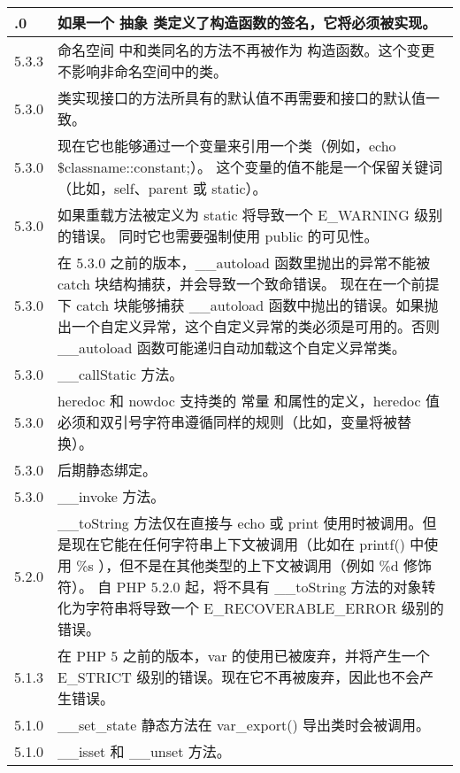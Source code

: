 \begin{longtable}{|m{30pt}|m{350pt}|}
\endlastfoot
\hline
5.4.0	 &如果一个 抽象 类定义了构造函数的签名，它将必须被实现。\\
\hline
5.3.3	 & 命名空间 中和类同名的方法不再被作为 构造函数。这个变更不影响非命名空间中的类。\\
\hline
5.3.0	 &类实现接口的方法所具有的默认值不再需要和接口的默认值一致。\\
\hline
5.3.0	 &现在它也能够通过一个变量来引用一个类（例如，echo \$classname::constant;）。 这个变量的值不能是一个保留关键词（比如，self、parent 或 static）。\\
\hline
5.3.0	 &如果重载方法被定义为 static 将导致一个 E\_WARNING 级别的错误。 同时它也需要强制使用 public 的可见性。\\
\hline
5.3.0	 &在 5.3.0 之前的版本，\_\_autoload 函数里抛出的异常不能被 catch 块结构捕获，并会导致一个致命错误。 现在在一个前提下 catch 块能够捕获 \_\_autoload 函数中抛出的错误。如果抛出一个自定义异常，这个自定义异常的类必须是可用的。否则 \_\_autoload 函数可能递归自动加载这个自定义异常类。\\
\hline
5.3.0	 & \_\_callStatic 方法。\\
\hline
5.3.0	 & heredoc 和 nowdoc 支持类的 常量 和属性的定义，heredoc 值必须和双引号字符串遵循同样的规则（比如，变量将被替换）。\\
\hline
5.3.0	 &后期静态绑定。\\
\hline
5.3.0	 & \_\_invoke 方法。\\
\hline
5.2.0	 &\_\_toString 方法仅在直接与 echo 或 print 使用时被调用。但是现在它能在任何字符串上下文被调用（比如在 printf() 中使用 \%s ），但不是在其他类型的上下文被调用（例如 \%d 修饰符）。 自 PHP 5.2.0 起，将不具有 \_\_toString 方法的对象转化为字符串将导致一个 E\_RECOVERABLE\_ERROR 级别的错误。\\
\hline
5.1.3	 &在 PHP 5 之前的版本，var 的使用已被废弃，并将产生一个 E\_STRICT 级别的错误。现在它不再被废弃，因此也不会产生错误。\\
\hline
5.1.0	 &\_\_set\_state 静态方法在 var\_export() 导出类时会被调用。\\
\hline
5.1.0	 &\_\_isset 和 \_\_unset 方法。\\
\hline
\end{longtable}











\clearpage
